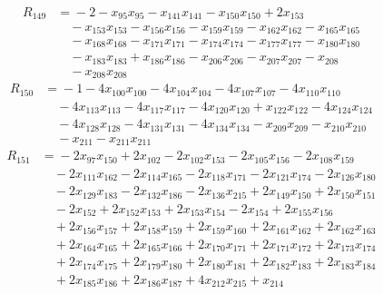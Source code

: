 \begin{align*}
R_{149}&={}-2 -x_{95}x_{95} -x_{141}x_{141} -x_{150}x_{150} +2x_{153}\\
&\quad{}-x_{153}x_{153} -x_{156}x_{156} -x_{159}x_{159} -x_{162}x_{162} -x_{165}x_{165}\\
&\quad{}-x_{168}x_{168} -x_{171}x_{171} -x_{174}x_{174} -x_{177}x_{177} -x_{180}x_{180}\\
&\quad{}-x_{183}x_{183} +x_{186}x_{186} -x_{206}x_{206} -x_{207}x_{207} -x_{208}\\
&\quad{}-x_{208}x_{208}
\end{align*}
\begin{align*}
R_{150}&={}-1 -4x_{100}x_{100} -4x_{104}x_{104} -4x_{107}x_{107} -4x_{110}x_{110}\\
&\quad{}-4x_{113}x_{113} -4x_{117}x_{117} -4x_{120}x_{120} +x_{122}x_{122} -4x_{124}x_{124}\\
&\quad{}-4x_{128}x_{128} -4x_{131}x_{131} -4x_{134}x_{134} -x_{209}x_{209} -x_{210}x_{210}\\
&\quad{}-x_{211} -x_{211}x_{211}
\end{align*}
\begin{align*}
R_{151}&={}-2x_{97}x_{150} +2x_{102} -2x_{102}x_{153} -2x_{105}x_{156} -2x_{108}x_{159}\\
&\quad{}-2x_{111}x_{162} -2x_{114}x_{165} -2x_{118}x_{171} -2x_{121}x_{174} -2x_{126}x_{180}\\
&\quad{}-2x_{129}x_{183} -2x_{132}x_{186} -2x_{136}x_{215} +2x_{149}x_{150} +2x_{150}x_{151}\\
&\quad{}-2x_{152} +2x_{152}x_{153} +2x_{153}x_{154} -2x_{154} +2x_{155}x_{156}\\
&\quad{}+2x_{156}x_{157} +2x_{158}x_{159} +2x_{159}x_{160} +2x_{161}x_{162} +2x_{162}x_{163}\\
&\quad{}+2x_{164}x_{165} +2x_{165}x_{166} +2x_{170}x_{171} +2x_{171}x_{172} +2x_{173}x_{174}\\
&\quad{}+2x_{174}x_{175} +2x_{179}x_{180} +2x_{180}x_{181} +2x_{182}x_{183} +2x_{183}x_{184}\\
&\quad{}+2x_{185}x_{186} +2x_{186}x_{187} +4x_{212}x_{215} +x_{214}
\end{align*}
